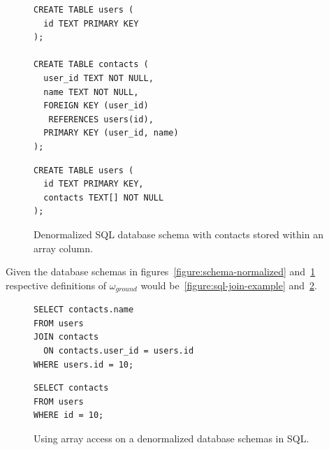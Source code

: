 \begin{figure}[ht]
  \vspace{1em}
  \hfill
  \begin{minipage}[b]{0.40\linewidth}
    \begin{verbatim}
CREATE TABLE users (
  id TEXT PRIMARY KEY
);

CREATE TABLE contacts (
  user_id TEXT NOT NULL,
  name TEXT NOT NULL,
  FOREIGN KEY (user_id) 
   REFERENCES users(id),
  PRIMARY KEY (user_id, name)
);
    \end{verbatim}
    \caption{Normalized SQL database schema with separate tables for users and contacts.}
    \label{figure:schema-normalized}
  \end{minipage}
  \hfill
  \begin{minipage}[b]{0.4\linewidth}
    \begin{verbatim}
CREATE TABLE users (
  id TEXT PRIMARY KEY,
  contacts TEXT[] NOT NULL
);
    \end{verbatim}
    \vspace{3.75em}
    \caption{Denormalized SQL database schema with contacts stored within an array column.}
    \label{figure:schema-denormalized}
  \end{minipage}
  \hfill
  \vspace{1em}
\end{figure}

Given the database schemas in figures~\ref{figure:schema-normalized} and~\ref{figure:schema-denormalized}
respective definitions of $\omega_{ground}$ would be~\ref{figure:sql-join-example}
and~\ref{figure:sql-array-example}.

\begin{figure}[ht]
  \vspace{1em}
  \hfill
  \begin{minipage}[b]{0.4\linewidth}
    \begin{verbatim}
SELECT contacts.name
FROM users
JOIN contacts
  ON contacts.user_id = users.id
WHERE users.id = 10;
    \end{verbatim}
    \caption{Using JOIN on a normalized database schema in SQL.}
    \label{figure:sql-join-example}
  \end{minipage}
  \hfill
  \begin{minipage}[b]{0.4\linewidth}
    \centering
    \begin{verbatim}
SELECT contacts
FROM users
WHERE id = 10;
    \end{verbatim}
    \vspace{1.3em}
    \caption{Using array access on a denormalized database schemas in SQL.}
    \label{figure:sql-array-example}
  \end{minipage}
  \hfill
  \vspace{1em}
\end{figure}


